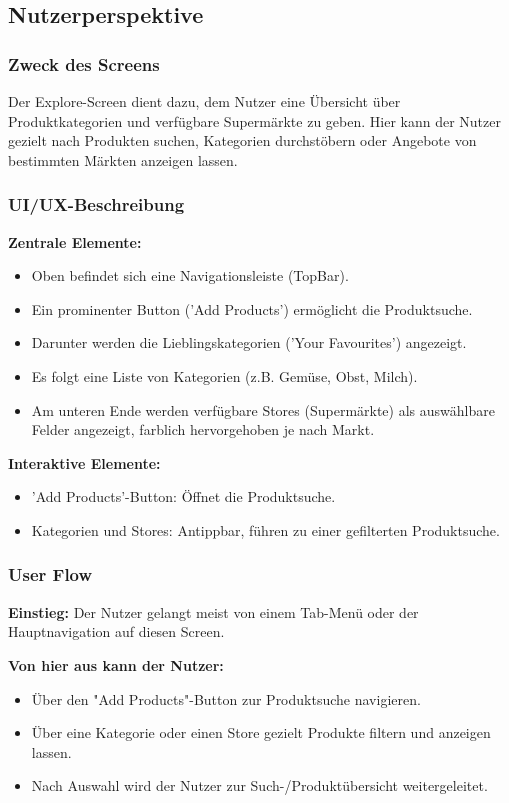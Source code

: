 \documentclass[12pt, a4paper]{report} %
\begin{document}
\subsection{Nutzerperspektive}

\subsubsection{Zweck des Screens}
Der Explore-Screen dient dazu, dem Nutzer eine Übersicht über Produktkategorien und verfügbare Supermärkte zu geben. Hier kann der Nutzer gezielt nach Produkten suchen, Kategorien durchstöbern oder Angebote von bestimmten Märkten anzeigen lassen.

\subsubsection{UI/UX-Beschreibung}

\textbf{Zentrale Elemente:}
\begin{itemize}
    \item Oben befindet sich eine Navigationsleiste (TopBar).
    \item Ein prominenter Button ('Add Products') ermöglicht die Produktsuche.
    \item Darunter werden die Lieblingskategorien ('Your Favourites') angezeigt.
    \item Es folgt eine Liste von Kategorien (z.B. Gemüse, Obst, Milch).
    \item Am unteren Ende werden verfügbare Stores (Supermärkte) als auswählbare Felder angezeigt, farblich hervorgehoben je nach Markt.
\end{itemize}

\noindent\textbf{Interaktive Elemente:}
\begin{itemize}
    \item 'Add Products'-Button: Öffnet die Produktsuche.
    \item Kategorien und Stores: Antippbar, führen zu einer gefilterten Produktsuche.
\end{itemize}

\subsubsection{User Flow}

\textbf{Einstieg:} Der Nutzer gelangt meist von einem Tab-Menü oder der Hauptnavigation auf diesen Screen.

\noindent\textbf{Von hier aus kann der Nutzer:}
\begin{itemize}
    \item Über den "Add Products"-Button zur Produktsuche navigieren.
    \item Über eine Kategorie oder einen Store gezielt Produkte filtern und anzeigen lassen.
    \item Nach Auswahl wird der Nutzer zur Such-/Produktübersicht weitergeleitet.
\end{itemize}
\end{document}
